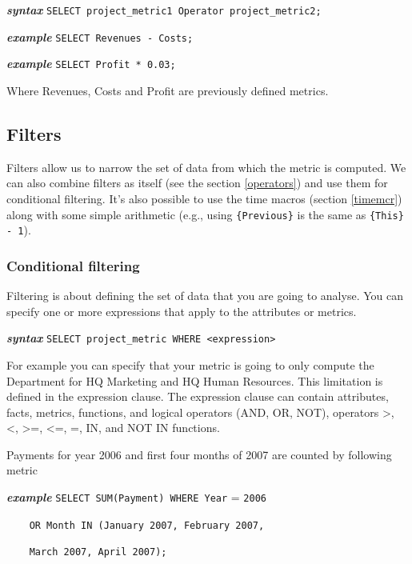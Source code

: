 \documentclass[a4paper, 12pt, titlepage, fleqn]{article}
\begin{document}
\textbf{\emph{syntax}}  \hspace{.9cm}\verb=SELECT project_metric1 Operator project_metric2;=

\textbf{\emph{example}} \hspace{.9cm}\verb=SELECT Revenues - Costs;=

\textbf{\emph{example}} \hspace{.9cm}\verb=SELECT Profit * 0.03;= 

\noindent Where Revenues, Costs and Profit are previously defined metrics.

\subsection{Filters}
Filters allow us to narrow the set of data from which the metric is computed. We can also combine filters as itself (see the section \ref{operators}) and use them for conditional filtering. It's also possible to use the time macros (section \ref{timemcr}) along with some simple arithmetic (e.g., using \verb={Previous}= is the same as \verb={This} - 1=). 

\subsubsection{Conditional filtering}
Filtering is about defining the set of data that you are going to analyse. You can specify one or more expressions that apply to the attributes or metrics. 

\textbf{\emph{syntax}}  \hspace{.9cm}\verb=SELECT project_metric WHERE <expression>=

For example you can specify that your metric is going to only compute the Department for HQ Marketing and HQ Human Resources. This limitation is defined in the expression clause. The expression clause can contain attributes, facts, metrics, functions, and logical operators (AND, OR, NOT), operators >, <, >=, <=, =, IN, and NOT IN functions.

Payments for year 2006 and first four months of 2007 are counted by following metric 

\textbf{\emph{example}}  \hspace{.9cm}\verb=SELECT SUM(Payment) WHERE Year= = \verb=2006 =

\hspace{2.2cm}\verb=	OR Month IN (January 2007, February 2007,= 

\hspace{2.2cm}\verb=	March 2007, April 2007);=
\end{document}

